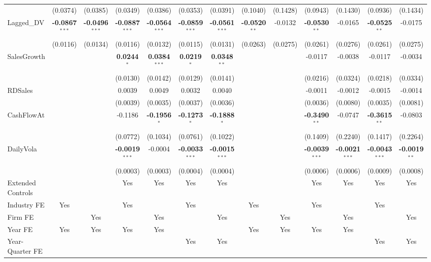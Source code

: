 \documentclass[11pt,a4paper]{article}
\begin{document}
\begin{table}[htbp]
\begin{tabular}{lcccccccccccc}
 & (0.0374) & (0.0385) & (0.0349) & (0.0386) & (0.0353) & (0.0391) & (0.1040) & (0.1428) & (0.0943) & (0.1430) & (0.0936) & (0.1434) \\
Lagged\_DV & \textbf{-0.0867}$^{***}$ & \textbf{-0.0496}$^{***}$ & \textbf{-0.0887}$^{***}$ & \textbf{-0.0564}$^{***}$ & \textbf{-0.0859}$^{***}$ & \textbf{-0.0561}$^{***}$ & \textbf{-0.0520}$^{**}$ & -0.0132 & \textbf{-0.0530}$^{**}$ & -0.0165 & \textbf{-0.0525}$^{**}$ & -0.0175 \\
 & (0.0116) & (0.0134) & (0.0116) & (0.0132) & (0.0115) & (0.0131) & (0.0263) & (0.0275) & (0.0261) & (0.0276) & (0.0261) & (0.0275) \\
SalesGrowth &  &  & \textbf{0.0244}$^{*}$ & \textbf{0.0384}$^{***}$ & \textbf{0.0219}$^{*}$ & \textbf{0.0348}$^{**}$ &  &  & -0.0117 & -0.0038 & -0.0117 & -0.0034 \\
 &  &  & (0.0130) & (0.0142) & (0.0129) & (0.0141) &  &  & (0.0216) & (0.0324) & (0.0218) & (0.0334) \\
RDSales &  &  & 0.0039 & 0.0049 & 0.0032 & 0.0040 &  &  & -0.0011 & -0.0012 & -0.0015 & -0.0014 \\
 &  &  & (0.0039) & (0.0035) & (0.0037) & (0.0036) &  &  & (0.0036) & (0.0080) & (0.0035) & (0.0081) \\
CashFlowAt &  &  & -0.1186 & \textbf{-0.1956}$^{*}$ & \textbf{-0.1273}$^{*}$ & \textbf{-0.1888}$^{*}$ &  &  & \textbf{-0.3490}$^{**}$ & -0.0747 & \textbf{-0.3615}$^{**}$ & -0.0803 \\
 &  &  & (0.0772) & (0.1034) & (0.0761) & (0.1022) &  &  & (0.1409) & (0.2240) & (0.1417) & (0.2264) \\
DailyVola &  &  & \textbf{-0.0019}$^{***}$ & -0.0004 & \textbf{-0.0033}$^{***}$ & \textbf{-0.0015}$^{***}$ &  &  & \textbf{-0.0039}$^{***}$ & \textbf{-0.0021}$^{***}$ & \textbf{-0.0043}$^{***}$ & \textbf{-0.0019}$^{**}$ \\
 &  &  & (0.0003) & (0.0003) & (0.0004) & (0.0004) &  &  & (0.0006) & (0.0006) & (0.0009) & (0.0008) \\
\midrule
Extended Controls &  &  & Yes & Yes & Yes & Yes &  &  & Yes & Yes & Yes & Yes \\
Industry FE & Yes &  & Yes &  & Yes &  & Yes &  & Yes &  & Yes &  \\
Firm FE &  & Yes &  & Yes &  & Yes &  & Yes &  & Yes &  & Yes \\
Year FE & Yes & Yes & Yes & Yes &  &  & Yes & Yes & Yes & Yes &  &  \\
Year-Quarter FE &  &  &  &  & Yes & Yes &  &  &  &  & Yes & Yes \\

\end{tabular}
\end{table}
\end{document}
